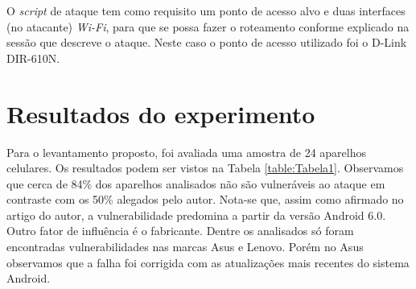 \documentclass[12pt]{article}
\begin{document}
O \textit{script} de ataque tem como requisito um ponto de acesso alvo e duas interfaces (no atacante) \textit{Wi-Fi}, para que se possa fazer o roteamento conforme explicado na sessão que descreve o ataque. Neste caso o ponto de acesso utilizado foi o D-Link DIR-610N.


\section{Resultados do experimento}
Para o levantamento proposto, foi avaliada uma amostra de 24 aparelhos celulares. Os resultados podem ser vistos na Tabela \ref{table:Tabela1}. Observamos que cerca de 84\% dos aparelhos analisados não são vulneráveis ao ataque em contraste com os 50\% alegados pelo autor. Nota-se que, assim como afirmado no artigo do autor, a vulnerabilidade predomina a partir da versão Android 6.0. Outro fator de influência é o fabricante. Dentre os analisados só foram encontradas vulnerabilidades nas marcas Asus e Lenovo. Porém no Asus observamos que a falha foi corrigida com as atualizações mais recentes do sistema Android. 
\end{document}
